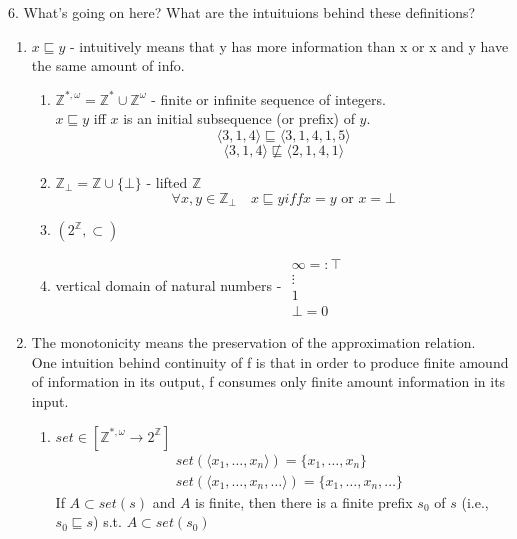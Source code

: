 \documentclass{report}[12pt]
\begin{document}
6. What's going on here? What are the intuituions behind these definitions?
\begin{enumerate}
    \item $x \sqsubseteq y$ - intuitively means that y has more information than x or x and y have the same amount of info.
    \begin{enumerate}
        \item $\mathbb{Z}^{*, \omega} = \mathbb{Z}^* \cup \mathbb{Z}^\omega$ - finite or infinite sequence of integers. \\
        $x\sqsubseteq y$ iff $x$ is an initial subsequence (or prefix) of $y$.
        \[\langle 3, 1, 4 \rangle \sqsubseteq \langle 3, 1, 4, 1, 5 \rangle\]
        \[\langle 3, 1, 4 \rangle \not\sqsubseteq \langle 2, 1, 4, 1 \rangle\]
        \item $\mathbb{Z}_\bot=\mathbb{Z}\cup \{\bot\}$ - lifted $\mathbb{Z}$ \\
        \[\forall x, y \in \mathbb{Z}_\bot \quad x\sqsubseteq y iff x=y \text{ or }x=\bot\]
        \item $(2^{\mathbb{Z}}, \subset)$
        \item vertical domain of natural numbers - $\begin{array}{c}\infty=:\top \\\vdots \\ 1 \\ \bot=0\end{array}$
    \end{enumerate}
    \item The monotonicity means the preservation of the approximation relation. \\
    One intuition behind continuity of f is that in order to produce finite amound of information in its output, f consumes only finite amount information in its input.
    \begin{enumerate}
        \item $set \in [\mathbb{Z}^{*, \omega}\rightarrow 2^{\mathbb{Z}}]$ \\
        \begin{align*}
            &set(\langle x_1, \ldots, x_n \rangle) = \{x_1, \ldots, x_n\} \\
            &set(\langle x_1, \ldots, x_n, \ldots \rangle) = \{x_1, \ldots, x_n, \ldots\}
        \end{align*}
        If $A \subset set(s)$ and $A$ is finite, then there is a finite prefix $s_0$ of $s$ (i.e., $s_0 \sqsubseteq s$) s.t. $A \subset set(s_0)$ \\

\end{enumerate}
\end{enumerate}
\end{document}
